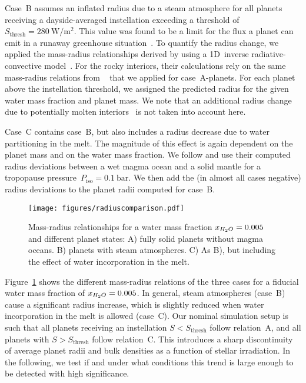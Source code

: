 \documentclass[modern]{aastex631}
\begin{document}
Case~B assumes an inflated radius due to a steam atmosphere for all planets receiving a dayside-averaged instellation exceeding a threshold of $S_\mathrm{thresh} = \SI{280}{\watt\per\meter\squared}$.
This value was found to be a limit for the flux a planet can emit in a runaway greenhouse situation~\citep{Goldblatt2013,Leconte2013}.
To quantify the radius change, we applied the mass-radius relationships derived by \citet{Turbet2020} using a 1D~inverse radiative-convective model~\citep{Turbet2019}.
For the rocky interiors, their calculations rely on the same mass-radius relations from ~\citep{Zeng2016} that we applied for case~A-planets.
For each planet above the instellation threshold, we assigned the predicted radius for the given water mass fraction and planet mass.
We note that an additional radius change due to potentially molten interiors~\citep{Bower2019} is not taken into account here.

Case~C contains case~B, but also includes a radius decrease due to water partitioning in the melt.
The magnitude of this effect is again dependent on the planet mass and on the water mass fraction.
We follow \citet{Dorn2021} and use their computed radius deviations between a wet magma ocean and a solid mantle for a tropopause pressure~$P_\mathrm{iso}=\SI{0.1}{\bar}$.
We then add the (in almost all cases negative) radius deviations to the planet radii computed for case~B.

\begin{figure}
    \begin{centering}
        \texttt{[image: figures/radiuscomparison.pdf]}
        \caption{Mass-radius relationships for a water mass fraction $x_{H_2O}= 0.005$ and different planet states: A) fully solid planets without magma oceans. B) planets with steam atmospheres. C) As B), but including the effect of water incorporation in the melt.}
        \label{fig:radiuscomparison}
    \end{centering}
\end{figure}

Figure~\ref{fig:radiuscomparison} shows the different mass-radius relations of the three cases for a fiducial water mass fraction of $x_{H_2O}= 0.005$.
In general, steam atmospheres (case~B) cause a significant radius increase, which is slightly reduced when water incorporation in the melt is allowed (case~C).
Our nominal simulation setup is such that all planets receiving an instellation $S < S_\mathrm{thresh}$ follow relation~A, and all planets with $S > S_\mathrm{thresh}$ follow relation~C.
This introduces a sharp discontinuity of average planet radii and bulk densities as a function of stellar irradiation.
In the following, we test if and under what conditions this trend is large enough to be detected with high significance.
\end{document}
